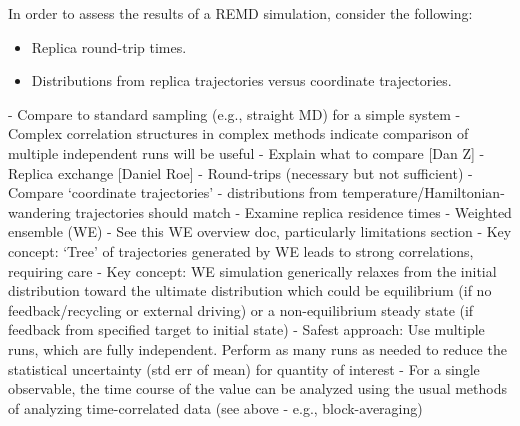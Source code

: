 In order to assess the results of a REMD simulation, consider the following:
\begin{itemize}
  \item Replica round-trip times.
  \item Distributions from replica trajectories versus coordinate trajectories.
\end{itemize}

- Compare to standard sampling (e.g., straight MD) for a simple system
- Complex correlation structures in complex methods indicate comparison of multiple independent runs will be useful
    - Explain what to compare [Dan Z]
- Replica exchange [Daniel Roe]
    - Round-trips (necessary but not sufficient)
    - Compare ‘coordinate trajectories’ - distributions from temperature/Hamiltonian-wandering trajectories should match
    - Examine replica residence times
- Weighted ensemble (WE)
    - See this WE overview doc, particularly limitations section
    - Key concept: ‘Tree’ of trajectories generated by WE leads to strong correlations, requiring care
    - Key concept: WE simulation generically relaxes from the initial distribution toward the ultimate distribution which could be equilibrium (if no feedback/recycling or external driving) or a non-equilibrium steady state (if feedback from specified target to initial state)
    - Safest approach: Use multiple runs, which are fully independent.  Perform as many runs as needed to reduce the statistical uncertainty (std err of mean) for quantity of interest
    - For a single observable, the time course of the value can be analyzed using the usual methods of analyzing time-correlated data (see above - e.g., block-averaging)

